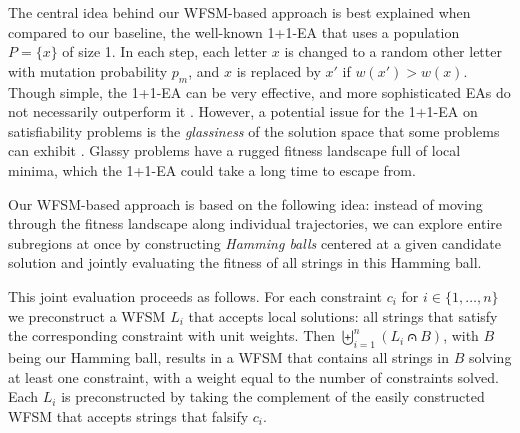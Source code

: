 \documentclass{llncs}
\begin{document}
The central idea behind our WFSM-based approach is best explained when
compared to our baseline, the well-known 1+1-EA that uses a population $P=\{x\}$ of size 1. 
In each step, each letter $x$ is changed to a random other letter with
mutation probability $p_m$, and $x$ is replaced by $x'$ if $w(x') > w(x)$. Though simple, the 1+1-EA
can be very effective, and more sophisticated EAs do not necessarily outperform it 
\cite{Borisovsky_2008}. 
However, a potential issue for the 1+1-EA on satisfiability problems is 
the \emph{glassiness} of the solution space that some problems can exhibit \cite{Martin_2001}.
Glassy problems have a rugged fitness landscape full of local minima, which the 
1+1-EA could take a long time to escape from.

Our WFSM-based approach is based on the following idea: instead of moving through 
the fitness landscape along individual trajectories, we can explore entire subregions at once
by constructing \emph{Hamming balls} centered at a given candidate solution and jointly evaluating the fitness of all strings in this Hamming ball.

This joint evaluation proceeds as follows.
For each constraint $c_i$ for $i \in \{1, \ldots, n\}$ we preconstruct
a WFSM $L_i$ that accepts local solutions:
all strings that satisfy the corresponding constraint with unit weights.
Then \mbox{$\biguplus_{i=1}^n (L_i \capdot B)$}, with $B$ being our Hamming ball,
results in a WFSM that contains all strings in $B$ solving at
least one constraint,
with a weight equal to the number of constraints solved.
Each $L_i$ is preconstructed by taking the complement of the easily
constructed WFSM that accepts strings that falsify $c_i$.
\end{document}

